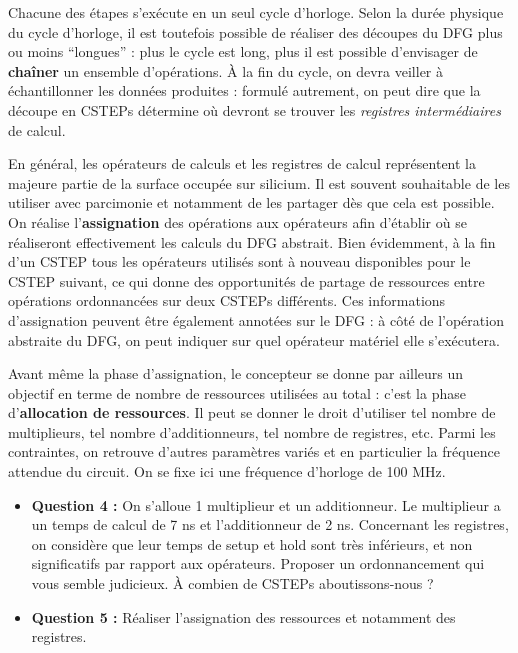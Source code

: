 \documentclass[a4paper,11pt]{article}
\begin{document}
Chacune des étapes s'exécute en un seul cycle d'horloge. Selon la durée physique du cycle d'horloge, il est toutefois possible de réaliser des découpes du DFG plus ou moins ``longues'' : plus le cycle est long, plus il est possible d'envisager de \textbf{chaîner} un ensemble d'opérations. À la fin du cycle, on devra veiller à échantillonner les données produites : formulé autrement, on peut dire que la découpe en CSTEPs détermine où devront se trouver les \textit{registres intermédiaires} de calcul.

En général, les opérateurs de calculs et les registres de calcul représentent la majeure partie de la surface occupée sur silicium. Il est souvent souhaitable de les utiliser avec parcimonie et notamment de les partager dès que cela est possible. On réalise l'\textbf{assignation} des opérations aux opérateurs afin d'établir où se réaliseront effectivement les calculs du DFG abstrait. Bien évidemment, à la fin d'un CSTEP tous les opérateurs utilisés sont à nouveau disponibles pour le CSTEP suivant, ce qui donne des opportunités de partage de ressources entre opérations ordonnancées sur deux CSTEPs différents. Ces informations d'assignation peuvent être également annotées sur le DFG : à côté de l'opération abstraite du DFG, on peut indiquer sur quel opérateur matériel elle s'exécutera.

Avant même la phase d'assignation, le concepteur se donne par ailleurs un objectif en terme de nombre de ressources utilisées au total : c'est la phase d'\textbf{allocation de ressources}. Il peut se donner le droit d'utiliser tel nombre de multiplieurs, tel nombre d'additionneurs, tel nombre de registres, etc. Parmi les contraintes, on retrouve d'autres paramètres variés et en particulier la fréquence attendue du circuit. On se fixe ici une fréquence d'horloge de 100 MHz.

\begin{questionbox}
\begin{itemize}
    \item \textbf{Question 4 :} On s'alloue 1 multiplieur et un additionneur. Le multiplieur a un temps de calcul de 7 ns et l'additionneur de 2 ns. Concernant les registres, on considère que leur temps de setup et hold sont très inférieurs, et non significatifs par rapport aux opérateurs. Proposer un ordonnancement qui vous semble judicieux. À combien de CSTEPs aboutissons-nous ?
    \item \textbf{Question 5 :} Réaliser l'assignation des ressources et notamment des registres.
\end{itemize}
\end{questionbox}
\end{document}
